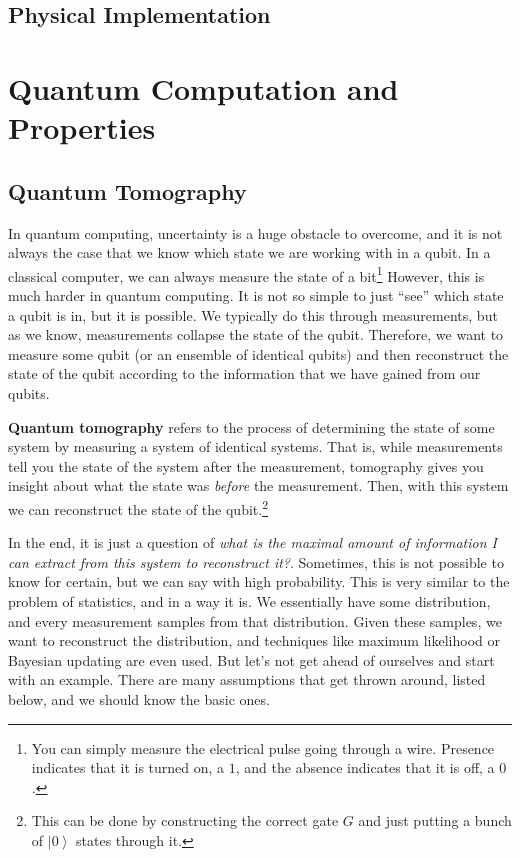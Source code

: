 \documentclass{article}
\newcommand{\ket}[1]{\ensuremath{\left|#1\right\rangle}}
\newcounter{question}[section]
\newcounter{definition}[section]
\newcounter{example}[section]
\begin{document}
  \subsection{Physical Implementation} 

\section{Quantum Computation and Properties}

  \subsection{Quantum Tomography}

    In quantum computing, uncertainty is a huge obstacle to overcome, and it is not always the case that we know which state we are working with in a qubit. In a classical computer, we can always measure the state of a bit\footnote{You can simply measure the electrical pulse going through a wire. Presence indicates that it is turned on, a $1$, and the absence indicates that it is off, a $0$. } However, this is much harder in quantum computing. It is not so simple to just ``see'' which state a qubit is in, but it is possible. We typically do this through measurements, but as we know, measurements collapse the state of the qubit. Therefore, we want to measure some qubit (or an ensemble of identical qubits) and then reconstruct the state of the qubit according to the information that we have gained from our qubits. 

    \begin{definition}
      \label{def:quantum-tomography}
      \textbf{Quantum tomography} refers to the process of determining the state of some system by measuring a system of identical systems. That is, while measurements tell you the state of the system after the measurement, tomography gives you insight about what the state was \textit{before} the measurement. Then, with this system we can reconstruct the state of the qubit.\footnote{This can be done by constructing the correct gate $G$ and just putting a bunch of $\ket{0}$ states through it.}
    \end{definition}

    In the end, it is just a question of \textit{what is the maximal amount of information I can extract from this system to reconstruct it?}. Sometimes, this is not possible to know for certain, but we can say with high probability. This is very similar to the problem of statistics, and in a way it is. We essentially have some distribution, and every measurement samples from that distribution. Given these samples, we want to reconstruct the distribution, and techniques like maximum likelihood or Bayesian updating are even used. But let's not get ahead of ourselves and start with an example. There are many assumptions that get thrown around, listed below, and we should know the basic ones. 
\end{document}

